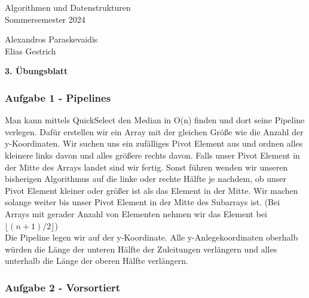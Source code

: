 \documentclass[11pt]{scrartcl}
\newcommand{\sheetNum}{3} %
\newcommand{\studentOne}{Alexandros Paraskevaidis} %
\newcommand{\studentTwo}{Elias Gestrich} %
\newcommand{\task}[1]{\subsubsection*{#1}}
\begin{document}
\begin{small}
\begin{minipage}{0.5 \linewidth}
  Algorithmen und Datenstrukturen\\
  Sommersemester 2024
\end{minipage}
\begin{minipage}{0.5\linewidth}
  \begin{flushright}
    \studentOne\\
    \studentTwo
  \end{flushright}
\end{minipage}
\end{small}
\begin{center}
\begin{sffamily}\Large\bfseries \sheetNum. Übungsblatt\end{sffamily}
\end{center}

\task{Aufgabe 1 - Pipelines}
Man kann mittels QuickSelect den Median in O(n) finden und dort seine Pipeline verlegen. Dafür erstellen wir ein Array mit der gleichen Größe wie die Anzahl der y-Koordinaten. Wir suchen uns ein zufälliges Pivot Element aus und ordnen alles kleinere links davon und alles größere rechts davon. Falls unser Pivot Element in der Mitte des Arrays landet sind wir fertig. Sonst führen wenden wir unseren bisherigen Algorithmus auf die linke oder rechte Hälfte je nachdem, ob unser Pivot Element kleiner oder größer ist als das Element in der Mitte. Wir machen solange weiter bis unser Pivot Element in der Mitte des Subarrays ist. (Bei Arrays mit gerader Anzahl von Elementen nehmen wir das Element bei $\lfloor(n + 1)/2\rfloor$) \\
Die Pipeline legen wir auf der y-Koordinate. Alle y-Anlegekoordinaten oberhalb würden die Länge der unteren Hälfte der Zuleitungen verlängern und alles unterhalb die Länge der oberen Hälfte verlängern.

\task{Aufgabe 2 - Vorsortiert}
\end{document}
